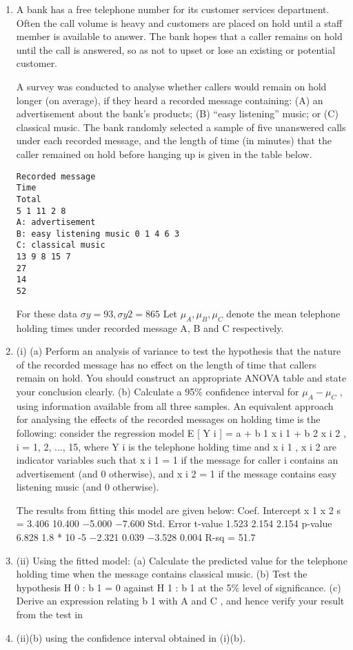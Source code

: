 \documentclass[a4paper,12pt]{article}
\begin{document}
\begin{enumerate}

\item A bank has a free telephone number for its customer services department. Often the call volume is heavy and customers are placed on hold until a staff member is available to answer. The bank hopes that a caller remains on hold until the call is
answered, so as not to upset or lose an existing or potential customer.

A survey was conducted to analyse whether callers would remain on hold longer (on average), if they heard a recorded message containing: (A) an advertisement about the bank’s products; (B) “easy listening” music; or (C) classical music. The bank
randomly selected a sample of five unanswered calls under each recorded message, and the length of time (in minutes) that the caller remained on hold before hanging up is given in the table below.
\begin{verbatim}
Recorded message
Time
Total
5 1 11 2 8
A: advertisement
B: easy listening music 0 1 4 6 3
C: classical music
13 9 8 15 7
27
14
52
\end{verbatim}
For these data $\sigma y = 93, \sigma y 2 = 865$
Let $\mu_A , \mu_B , \mu_C$ denote the mean telephone holding times under recorded message A, B and C respectively.
\item (i)
(a) Perform an analysis of variance to test the hypothesis that the nature of the recorded message has no effect on the length of time that callers remain on hold. You should construct an appropriate ANOVA table and state your conclusion clearly.
(b) Calculate a 95\% confidence interval for $\mu_A − \mu_C$ , using information available from all three samples.
An equivalent approach for analysing the effects of the recorded messages on holding
time is the following:
consider the regression model E [ Y i ] = a + b 1 x i 1 + b 2 x i 2 , i = 1, 2, ..., 15, where Y i is the telephone holding time and x i 1 , x i 2 are indicator variables such that x i 1 = 1 if the message for caller i contains an advertisement (and 0 otherwise), and x i 2 = 1 if the message contains easy listening music (and 0 otherwise).

The results from fitting this model are given below:
Coef.
Intercept
x 1
x 2
s = 3.406
10.400
−5.000
−7.600
Std. Error t-value
1.523
2.154
2.154
p-value
6.828 1.8 * 10 -5
−2.321
0.039
−3.528
0.004
R-sq = 51.7%
\item (ii)
Using the fitted model:
(a) Calculate the predicted value for the telephone holding time when the message contains classical music.
(b) Test the hypothesis H 0 : b 1 = 0 against H 1 : b 1  at the 5\% level of significance.
(c) Derive an expression relating b 1 with \mu  A and \mu  C , and hence verify your result from the test in \item (ii)(b) using the confidence interval
obtained in (i)(b).

\end{enumerate}
\end{document}
